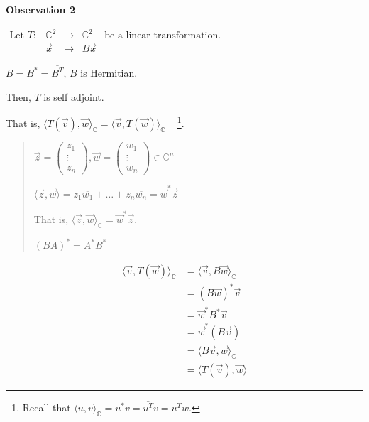 \documentclass[11pt,fleqn]{book} %
\begin{document}
\textbf{Observation 2}

$\begin{matrix} \text{Let }T: &\mathbb{C}^2 &\to &\mathbb{C}^2 &\text{be a linear transformation}. \\ &\vec{x} &\mapsto &B\vec{x} \end{matrix}$

$B = B^* = \overline{B^T}$, $B$ is Hermitian.

Then, $T$ is self adjoint.

That is, $\langle T(\vec{v}), \vec{w} \rangle_{\mathbb{C}} = \langle \vec{v}, T(\vec{w}) \rangle_{\mathbb{C}}$ ~ \footnote{Recall that $\langle u, v \rangle_{\mathbb{C}} = u^*v = \overline{u^T} v = u^T\overline{w}$. }.

\begin{quote}
    $\vec{z} = \begin{pmatrix} z_1 \\ \vdots \\ z_n \end{pmatrix}, \vec{w} = \begin{pmatrix} w_1 \\ \vdots \\ w_n \end{pmatrix} \in \mathbb{C}^n$

    $\langle \vec{z}, \vec{w} \rangle = z_1 \overline{w_1} + \dots + z_n\overline{w_n} = \vec{w}^* \vec{z}$

    That is, $\langle \vec{z}, \vec{w} \rangle_\mathbb{C} = \vec{w}^* \vec{z}$.

    $(BA)^* = A^*B^*$
\end{quote}
\begin{align*}
    \langle \vec{v}, T(\vec{w}) \rangle_\mathbb{C}
    &= \langle \vec{v}, B\vec{w} \rangle_\mathbb{C}
    \\
    &= (B\vec{w})^*\vec{v}
    \\
    &= \vec{w}^*B^*\vec{v}
    \\
    &= \vec{w}^* (B\vec{v})
    \\
    &= \langle B\vec{v}, \vec{w} \rangle_\mathbb{C}
    \\
    &= \langle T(\vec{v}), \vec{w} \rangle
\end{align*}
\end{document}
